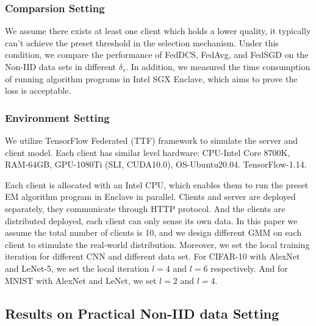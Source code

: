 \documentclass[conference]{IEEEtran}
\begin{document}
\subsubsection{Comparsion Setting}
We assume there exists at least one client which holds a lower quality, 
it typically can't achieve the preset threshold in the selection mechanism. 
Under this condition, we compare the performance of FedDCS, FedAvg, and FedSGD on 
the Non-IID data sets in different $\delta_s$. In addition, we measured the time consumption of
running algorithm programs in Intel SGX Enclave, which aims to prove the loss
is acceptable.

\subsubsection{Environment Setting}
We utilize TensorFlow Federated (TTF) framework to simulate the server and client model.
Each client has similar level hardware: CPU-Intel Core 8700K, RAM-64GB, GPU-1080Ti 
(SLI, CUDA10.0), OS-Ubuntu20.04. TensorFlow-1.14.

Each client is allocated with an Intel CPU, which enables them to run the preset 
EM algorithm program in Enclave in parallel. Clients and server are deployed 
separately, they communicate through HTTP protocol. 
And the clients are distributed deployed, each client can only sense its own data.
In this paper we assume the total number of clients is 10, and we design different GMM on each client to 
stimulate the real-world distribution. Moreover, we set the local training iteration for different CNN and 
different data set. For CIFAR-10 with AlexNet and LeNet-5, we set the local iteration $l = 4$ and $l = 6$ respectively. 
And for MNIST with AlexNet and LeNet, we set $l = 2$ and $l=4$.
\subsection{Results on Practical  Non-IID data Setting}
\end{document}
